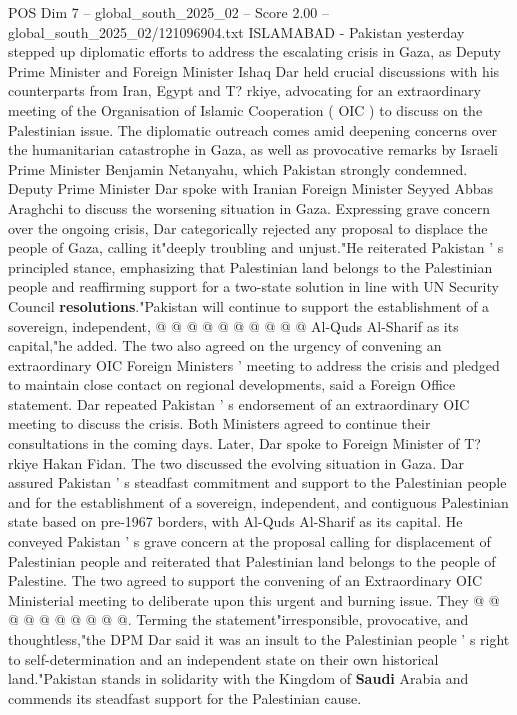 \begin{textsample}{POS Dim 7 – global\_south\_2025\_02 – Score 2.00 – global\_south\_2025\_02/121096904.txt}  \label{ex:f7_pos_188}
ISLAMABAD - Pakistan yesterday stepped up diplomatic efforts to address the escalating crisis in Gaza, as Deputy Prime Minister and Foreign Minister Ishaq Dar held crucial discussions with his counterparts from Iran, Egypt and T? rkiye, advocating for an extraordinary meeting of the Organisation of Islamic Cooperation ( OIC ) to discuss on the Palestinian issue.
The diplomatic outreach comes amid deepening concerns over the humanitarian catastrophe in Gaza, as well as provocative remarks by Israeli Prime Minister Benjamin Netanyahu, which Pakistan strongly condemned.
Deputy Prime Minister Dar spoke with Iranian Foreign Minister Seyyed Abbas Araghchi to discuss the worsening situation in Gaza.
Expressing grave concern over the ongoing crisis, Dar categorically rejected any proposal to displace the people of Gaza, calling it"deeply troubling and unjust."He reiterated Pakistan ' s principled stance, emphasizing that Palestinian land belongs to the Palestinian people and reaffirming support for a two-state solution in line with UN Security Council \textbf{resolutions}."Pakistan will continue to support the establishment of a sovereign, independent, @ @ @ @ @ @ @ @ @ @ Al-Quds Al-Sharif as its capital,"he added.
The two also agreed on the urgency of convening an extraordinary OIC Foreign Ministers ' meeting to address the crisis and pledged to maintain close contact on regional developments, said a Foreign Office statement.
Dar repeated Pakistan ' s endorsement of an extraordinary OIC meeting to discuss the crisis.
Both Ministers agreed to continue their consultations in the coming days.
Later, Dar spoke to Foreign Minister of T? rkiye Hakan Fidan.
The two discussed the evolving situation in Gaza.
Dar assured Pakistan ' s steadfast commitment and support to the Palestinian people and for the establishment of a sovereign, independent, and contiguous Palestinian state based on pre-1967 borders, with Al-Quds Al-Sharif as its capital.
He conveyed Pakistan ' s grave concern at the proposal calling for displacement of Palestinian people and reiterated that Palestinian land belongs to the people of Palestine.
The two agreed to support the convening of an Extraordinary OIC Ministerial meeting to deliberate upon this urgent and burning issue.
They @ @ @ @ @ @ @ @ @ @.
Terming the statement"irresponsible, provocative, and thoughtless,"the DPM Dar said it was an insult to the Palestinian people ' s right to self-determination and an independent state on their own historical land."Pakistan stands in solidarity with the Kingdom of \textbf{Saudi} Arabia and commends its steadfast support for the Palestinian cause.

\end{textsample}
